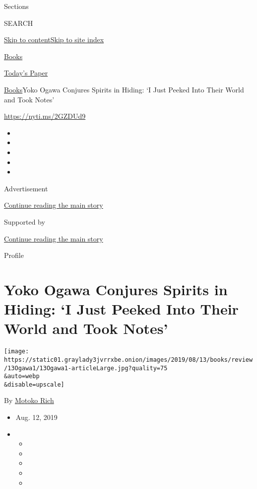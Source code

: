 Sections

SEARCH

\protect\hyperlink{site-content}{Skip to
content}\protect\hyperlink{site-index}{Skip to site index}

\href{https://www.nytimes3xbfgragh.onion/section/books}{Books}

\href{https://myaccount.nytimes3xbfgragh.onion/auth/login?response_type=cookie\&client_id=vi}{}

\href{https://www.nytimes3xbfgragh.onion/section/todayspaper}{Today's
Paper}

\href{/section/books}{Books}\textbar{}Yoko Ogawa Conjures Spirits in
Hiding: `I Just Peeked Into Their World and Took Notes'

\url{https://nyti.ms/2GZDUd9}

\begin{itemize}
\item
\item
\item
\item
\item
\end{itemize}

Advertisement

\protect\hyperlink{after-top}{Continue reading the main story}

Supported by

\protect\hyperlink{after-sponsor}{Continue reading the main story}

Profile

\hypertarget{yoko-ogawa-conjures-spirits-in-hiding-i-just-peeked-into-their-world-and-took-notes}{%
\section{Yoko Ogawa Conjures Spirits in Hiding: `I Just Peeked Into
Their World and Took
Notes'}\label{yoko-ogawa-conjures-spirits-in-hiding-i-just-peeked-into-their-world-and-took-notes}}

\texttt{[image: https://static01.graylady3jvrrxbe.onion/images/2019/08/13/books/review/13Ogawa1/13Ogawa1-articleLarge.jpg?quality=75\\\&auto=webp\\\&disable=upscale]}

By \href{https://www.nytimes3xbfgragh.onion/by/motoko-rich}{Motoko Rich}

\begin{itemize}
\item
  Aug. 12, 2019
\item
  \begin{itemize}
  \item
  \item
  \item
  \item
  \item
  \end{itemize}
\end{itemize}

